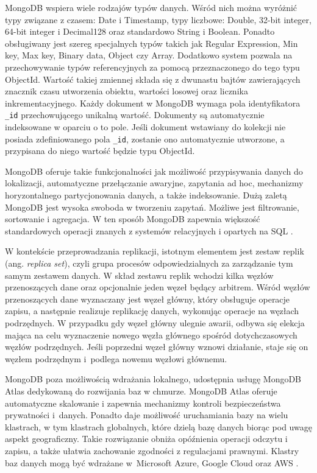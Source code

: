 \documentclass[a4paper,twoside,12pt]{book}
\newcommand{\obcy}[1]{\emph{#1}}
\newcommand{\ang}[1]{{\selectlanguage{british}\obcy{#1}}}
\begin{document}
MongoDB wspiera wiele rodzajów typów danych. Wśród nich można wyróżnić typy związane z czasem: Date i Timestamp, typy liczbowe: Double, 32-bit integer, 64-bit integer i Decimal128 oraz standardowo String i Boolean. Ponadto obsługiwany jest szereg specjalnych typów takich jak Regular Expression, Min key, Max key, Binary data, Object czy Array. Dodatkowo system pozwala na przechowywanie typów referencyjnych za pomocą przeznaczonego do tego typu ObjectId. Wartość takiej zmiennej składa się z dwunastu bajtów zawierających znacznik czasu utworzenia obiektu, wartości losowej oraz licznika inkrementacyjnego. Każdy dokument w MongoDB wymaga pola identyfikatora \texttt{\_id} przechowującego unikalną wartość. Dokumenty są automatycznie indeksowane w oparciu o to pole. Jeśli dokument wstawiany do kolekcji nie posiada zdefiniowanego pola \texttt{\_id}, zostanie ono automatycznie utworzone, a przypisana do niego wartość będzie typu ObjectId.    

MongoDB oferuje takie funkcjonalności jak możliwość przypisywania danych do lokalizacji, automatyczne przełączanie awaryjne, zapytania ad hoc, mechanizmy horyzontalnego partycjonowania danych, a także indeksowanie. Dużą zaletą MongoDB jest wysoka swoboda w tworzeniu zapytań. Możliwe jest filtrowanie, sortowanie i agregacja. W ten sposób MongoDB zapewnia większość standardowych operacji znanych z systemów relacyjnych i opartych na SQL \cite{bib:performance-evaluation-of-sql-and-nosql-database-management-systems-in-a-cluster}. 

W kontekście przeprowadzania replikacji, istotnym elementem jest zestaw replik (ang. \ang{replica set}), czyli grupa procesów odpowiedzialnych za zarządzanie tym samym zestawem danych. W skład zestawu replik wchodzi kilka węzłów przenoszących dane oraz opcjonalnie jeden węzeł będący arbitrem. Wśród węzłów przenoszących dane wyznaczany jest węzeł główny, który obsługuje operacje zapisu, a następnie realizuje replikację danych, wykonując operacje na węzłach podrzędnych. W przypadku gdy węzeł główny ulegnie awarii, odbywa się elekcja mająca na celu wyznaczenie nowego węzła głównego spośród dotychczasowych węzłów podrzędnych. Jeśli poprzedni węzeł główny wznowi działanie, staje się on węzłem podrzędnym i~podlega nowemu węzłowi głównemu.

MongoDB poza możliwością wdrażania lokalnego, udostępnia usługę MongoDB Atlas dedykowaną do rozwijania baz w chmurze. MongoDB Atlas oferuje automatyczne skalowanie i zapewnia mechanizmy kontroli bezpieczeństwa prywatności i~danych. Ponadto daje możliwość uruchamiania bazy na wielu klastrach, w tym klastrach globalnych, które dzielą bazę danych biorąc pod uwagę aspekt geograficzny. Takie rozwiązanie obniża opóźnienia operacji odczytu i zapisu, a także ułatwia zachowanie zgodności z regulacjami prawnymi. Klastry baz danych mogą być wdrażane w~Microsoft Azure, Google Cloud oraz AWS \cite{bib:MongoDBAtlasDocumentation}.
\end{document}
